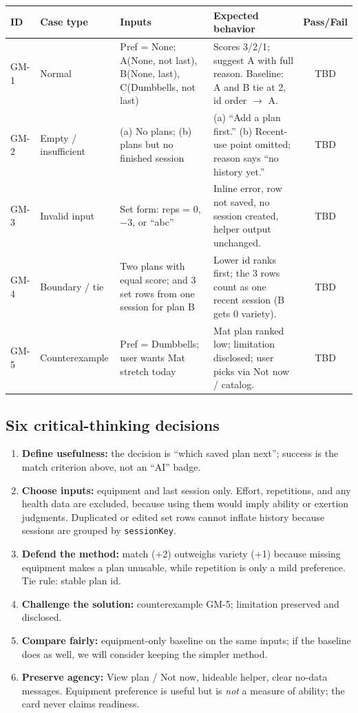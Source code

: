\documentclass[11pt]{article}
\begin{document}
\begin{tabularx}{\textwidth}{@{}P{1.6cm}P{2.3cm}LL c@{}}
\toprule
\textbf{ID} & \textbf{Case type} & \textbf{Inputs} & \textbf{Expected behavior} & \textbf{Pass/Fail} \\
\midrule
GM-1 & Normal & Pref = None; A(None, not last), B(None, last), C(Dumbbells, not last) & Scores 3/2/1; suggest A with full reason. Baseline: A and B tie at 2, id order $\rightarrow$ A. & TBD \\
GM-2 & Empty / insufficient & (a) No plans; (b) plans but no finished session & (a) ``Add a plan first.'' (b) Recent-use point omitted; reason says ``no history yet.'' & TBD \\
GM-3 & Invalid input & Set form: reps = 0, $-3$, or ``abc'' & Inline error, row not saved, no session created, helper output unchanged. & TBD \\
GM-4 & Boundary / tie & Two plans with equal score; and 3 set rows from one session for plan B & Lower id ranks first; the 3 rows count as one recent session (B gets 0 variety). & TBD \\
GM-5 & Counterexample & Pref = Dumbbells; user wants Mat stretch today & Mat plan ranked low; limitation disclosed; user picks via Not now / catalog. & TBD \\
\bottomrule
\end{tabularx}

\subsection*{Six critical-thinking decisions}
\begin{enumerate}
  \item \textbf{Define usefulness:} the decision is ``which saved plan next''; success is the match criterion above, not an ``AI'' badge.
  \item \textbf{Choose inputs:} equipment and last session only. Effort, repetitions, and any health data are excluded, because using them would imply ability or exertion judgments. Duplicated or edited set rows cannot inflate history because sessions are grouped by \texttt{sessionKey}.
  \item \textbf{Defend the method:} match (+2) outweighs variety (+1) because missing equipment makes a plan unusable, while repetition is only a mild preference. Tie rule: stable plan id.
  \item \textbf{Challenge the solution:} counterexample GM-5; limitation preserved and disclosed.
  \item \textbf{Compare fairly:} equipment-only baseline on the same inputs; if the baseline does as well, we will consider keeping the simpler method.
  \item \textbf{Preserve agency:} View plan / Not now, hideable helper, clear no-data messages. Equipment preference is useful but is \emph{not} a measure of ability; the card never claims readiness.
\end{enumerate}
\end{document}
